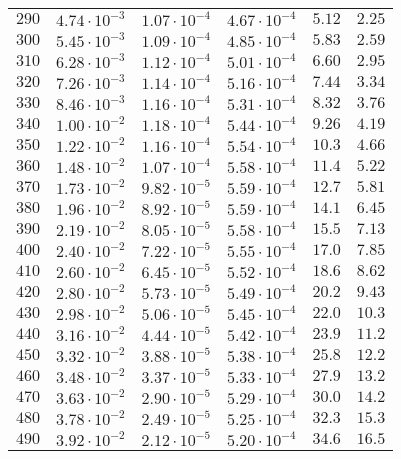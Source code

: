 \begin{table}
\begin{tabular}{lccccc}
$290 $&$ 4.74\cdot 10^{-3} $&$ 1.07\cdot 10^{-4} $&$ 4.67\cdot 10^{-4} $&$ 5.12 $&$ 2.25  $\\
$300 $&$ 5.45\cdot 10^{-3} $&$ 1.09\cdot 10^{-4} $&$ 4.85\cdot 10^{-4} $&$ 5.83 $&$ 2.59  $\\
$310 $&$ 6.28\cdot 10^{-3} $&$ 1.12\cdot 10^{-4} $&$ 5.01\cdot 10^{-4} $&$ 6.60 $&$ 2.95  $\\
$320 $&$ 7.26\cdot 10^{-3} $&$ 1.14\cdot 10^{-4} $&$ 5.16\cdot 10^{-4} $&$ 7.44 $&$ 3.34  $\\
$330 $&$ 8.46\cdot 10^{-3} $&$ 1.16\cdot 10^{-4} $&$ 5.31\cdot 10^{-4} $&$ 8.32 $&$ 3.76  $\\
$340 $&$ 1.00\cdot 10^{-2} $&$ 1.18\cdot 10^{-4} $&$ 5.44\cdot 10^{-4} $&$ 9.26 $&$ 4.19  $\\
$350 $&$ 1.22\cdot 10^{-2} $&$ 1.16\cdot 10^{-4} $&$ 5.54\cdot 10^{-4} $&$ 10.3 $&$ 4.66  $\\
$360 $&$ 1.48\cdot 10^{-2} $&$ 1.07\cdot 10^{-4} $&$ 5.58\cdot 10^{-4} $&$ 11.4 $&$ 5.22  $\\
$370 $&$ 1.73\cdot 10^{-2} $&$ 9.82\cdot 10^{-5} $&$ 5.59\cdot 10^{-4} $&$ 12.7 $&$ 5.81  $\\
$380 $&$ 1.96\cdot 10^{-2} $&$ 8.92\cdot 10^{-5} $&$ 5.59\cdot 10^{-4} $&$ 14.1 $&$ 6.45  $\\
$390 $&$ 2.19\cdot 10^{-2} $&$ 8.05\cdot 10^{-5} $&$ 5.58\cdot 10^{-4} $&$ 15.5 $&$ 7.13  $\\
$400 $&$ 2.40\cdot 10^{-2} $&$ 7.22\cdot 10^{-5} $&$ 5.55\cdot 10^{-4} $&$ 17.0 $&$ 7.85  $\\
$410 $&$ 2.60\cdot 10^{-2} $&$ 6.45\cdot 10^{-5} $&$ 5.52\cdot 10^{-4} $&$ 18.6 $&$ 8.62  $\\
$420 $&$ 2.80\cdot 10^{-2} $&$ 5.73\cdot 10^{-5} $&$ 5.49\cdot 10^{-4} $&$ 20.2 $&$ 9.43  $\\
$430 $&$ 2.98\cdot 10^{-2} $&$ 5.06\cdot 10^{-5} $&$ 5.45\cdot 10^{-4}
$&$ 22.0 $&$ 10.3 $\\
$440 $&$ 3.16\cdot 10^{-2} $&$ 4.44\cdot 10^{-5} $&$ 5.42\cdot 10^{-4}
$&$ 23.9 $&$ 11.2 $\\
$450 $&$ 3.32\cdot 10^{-2} $&$ 3.88\cdot 10^{-5} $&$ 5.38\cdot 10^{-4}
$&$ 25.8 $&$ 12.2 $\\
$460 $&$ 3.48\cdot 10^{-2} $&$ 3.37\cdot 10^{-5} $&$ 5.33\cdot 10^{-4}
$&$ 27.9 $&$ 13.2 $\\
$470 $&$ 3.63\cdot 10^{-2} $&$ 2.90\cdot 10^{-5} $&$ 5.29\cdot 10^{-4}
$&$ 30.0 $&$ 14.2 $\\
$480 $&$ 3.78\cdot 10^{-2} $&$ 2.49\cdot 10^{-5} $&$ 5.25\cdot 10^{-4}
$&$ 32.3 $&$ 15.3 $\\
$490 $&$ 3.92\cdot 10^{-2} $&$ 2.12\cdot 10^{-5} $&$ 5.20\cdot 10^{-4}
$&$ 34.6 $&$ 16.5 $\\
\hline
  \end{tabular}
\end{table}

